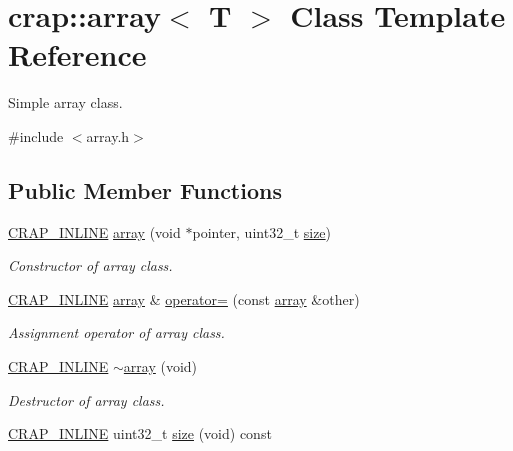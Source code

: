 \hypertarget{classcrap_1_1array}{\section{crap\+:\+:array$<$ T $>$ Class Template Reference}
\label{classcrap_1_1array}
}


Simple array class.  




{\ttfamily \#include $<$array.\+h$>$}

\subsection*{Public Member Functions}
\begin{DoxyCompactItemize}
\item 
\hyperlink{config__x86_8h_a5a40526b8d842e7ff731509998bb0f1c}{C\+R\+A\+P\+\_\+\+I\+N\+L\+I\+N\+E} \hyperlink{classcrap_1_1array_af72adceda49b018031c4fcc2cf62cfb5}{array} (void $\ast$pointer, uint32\+\_\+t \hyperlink{classcrap_1_1array_a3d91ef71204aa78a9a7bd9e7063151e8}{size})
\begin{DoxyCompactList}\small\item\em Constructor of array class. \end{DoxyCompactList}\item 
\hyperlink{config__x86_8h_a5a40526b8d842e7ff731509998bb0f1c}{C\+R\+A\+P\+\_\+\+I\+N\+L\+I\+N\+E} \hyperlink{classcrap_1_1array}{array} \& \hyperlink{classcrap_1_1array_a0af5753ce249c8c4f6e59e6521c95ca7}{operator=} (const \hyperlink{classcrap_1_1array}{array} \&other)
\begin{DoxyCompactList}\small\item\em Assignment operator of array class. \end{DoxyCompactList}\item 
\hyperlink{config__x86_8h_a5a40526b8d842e7ff731509998bb0f1c}{C\+R\+A\+P\+\_\+\+I\+N\+L\+I\+N\+E} \hyperlink{classcrap_1_1array_ad72ebb4527f76bf253557c48619f8326}{$\sim$array} (void)
\begin{DoxyCompactList}\small\item\em Destructor of array class. \end{DoxyCompactList}\item 
\hyperlink{config__x86_8h_a5a40526b8d842e7ff731509998bb0f1c}{C\+R\+A\+P\+\_\+\+I\+N\+L\+I\+N\+E} uint32\+\_\+t \hyperlink{classcrap_1_1array_a3d91ef71204aa78a9a7bd9e7063151e8}{size} (void) const 
\item 

\end{DoxyCompactItemize}
